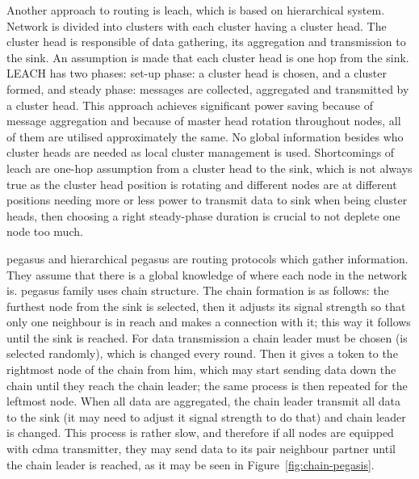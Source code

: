 Another approach to routing is \acrfull{leach}, which is based on hierarchical system. Network is divided into clusters with each cluster having a cluster head. The cluster head is responsible of data gathering, its aggregation and transmission to the sink. An assumption is made that each cluster head is one hop from the sink. LEACH has two phases: set-up phase: a cluster head is chosen, and a cluster formed, and steady phase: messages are collected, aggregated and transmitted by a cluster head. This approach achieves significant power saving because of message aggregation and because of master head rotation throughout nodes, all of them are utilised approximately the same. No global information besides who cluster heads are needed as local cluster management is used. Shortcomings of \acrshort{leach} are one-hop assumption from a cluster head to the sink, which is not always true as the cluster head position is rotating and different nodes are at different positions needing more or less power to transmit data to sink when being cluster heads, then choosing a right steady-phase duration is crucial to not deplete one node too much.

\acrfull{pegasus} and hierarchical \acrshort{pegasus} are routing protocols which gather information. They assume that there is a global knowledge of where each node in the network is. \acrshort{pegasus} family uses chain structure. The chain formation is as follows: the furthest node from the sink is selected, then it adjusts its signal strength so that only one neighbour is in reach and makes a connection with it; this way it follows until the sink is reached. For data transmission a chain leader must be chosen (is selected randomly), which is changed every round. Then it gives a token to the rightmost node of the chain from him, which may start sending data down the chain until they reach the chain leader; the same process is then repeated for the leftmost node. When all data are aggregated, the chain leader transmit all data to the sink (it may need to adjust it signal strength to do that) and chain leader is changed. This process is rather slow, and therefore if all nodes are equipped with \acrshort{cdma} transmitter, they may send data to its pair neighbour partner until the chain leader is reached, as it may be seen in Figure~\ref{fig:chain-pegasis}.

